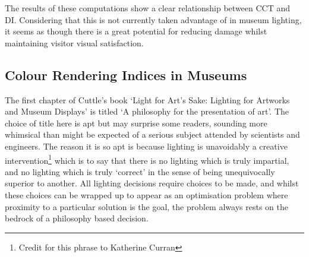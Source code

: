 %

\begin{fullpagefigure}
\figpageside{}
\caption{The \glspl{CCT} and \glspl{DI} of the \glspl{SPD} used by \citet{houser_review_2013} [provided via personal communication, but now partially (without category information) available via \gls{PTB} as `spd\_houser'].}
\label{fig:CCTvsDI}
\end{fullpagefigure}

The results of these computations show a clear relationship between \gls{CCT} and \gls{DI}. Considering that this is not currently taken advantage of in museum lighting, it seems as though there is a great potential for reducing damage whilst maintaining visitor visual satisfaction.


\cleardoublepage %

\subsection{Colour Rendering Indices in Museums}

The first chapter of Cuttle's book `Light for Art's Sake: Lighting for Artworks and Museum Displays'\citep{cuttle_light_2007} is titled `A philosophy for the presentation of art'. The choice of title here is apt but may surprise some readers, sounding more whimsical than might be expected of a serious subject attended by scientists and engineers. The reason it is so apt is because lighting is unavoidably a creative intervention\footnote{Credit for this phrase to Katherine Curran} which is to say that there is no lighting which is truly impartial, and no lighting which is truly `correct' in the sense of being unequivocally superior to another. All lighting decisions require choices to be made, and whilst these choices can be wrapped up to appear as an optimisation problem where proximity to a particular solution is the goal, the problem always rests on the bedrock of a philosophy based decision.

